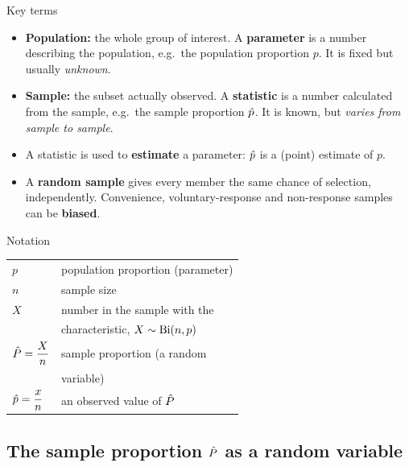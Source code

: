 \begin{cols}
\begin{defn}{Key terms}
\begin{itemize}
  \item \textbf{Population:} the whole group of interest. A \textbf{parameter} is a number describing the population, e.g.\ the population proportion $p$. It is fixed but usually \emph{unknown}.
  \item \textbf{Sample:} the subset actually observed. A \textbf{statistic} is a number calculated from the sample, e.g.\ the sample proportion $\hat{p}$. It is known, but \emph{varies from sample to sample}.
  \item A statistic is used to \textbf{estimate} a parameter: $\hat{p}$ is a (point) estimate of $p$.
  \item A \textbf{random sample} gives every member the same chance of selection, independently. Convenience, voluntary-response and non-response samples can be \textbf{biased}.
\end{itemize}
\end{defn}
\nextcol
\begin{keyres}{Notation}
\renewcommand{\arraystretch}{1.3}
\begin{tabular}{@{}ll@{}}
$p$ & population proportion (parameter)\\
$n$ & sample size\\
$X$ & number in the sample with the\\ & characteristic, $X\sim\mathrm{Bi}(n,p)$\\
$\hat{P}=\dfrac Xn$ & sample proportion (a random\\ & variable)\\
$\hat{p}=\dfrac xn$ & an observed value of $\hat{P}$\\
\end{tabular}
\end{keyres}
\end{cols}

\subsection{The sample proportion $\hat{P}$ as a random variable}
\label{sec:phat}

